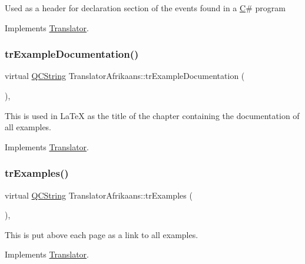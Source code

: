 Used as a header for declaration section of the events found in a \mbox{\hyperlink{class_c}{C}}\# program 

Implements \mbox{\hyperlink{class_translator}{Translator}}.

\mbox{\label{class_translator_afrikaans_a0e9bafa9d7cc3a476f5d3504bb607619}} 
\subsubsection{\texorpdfstring{trExampleDocumentation()}{trExampleDocumentation()}}
{\footnotesize\ttfamily virtual \mbox{\hyperlink{class_q_c_string}{Q\+C\+String}} Translator\+Afrikaans\+::tr\+Example\+Documentation (\begin{DoxyParamCaption}{ }\end{DoxyParamCaption})\hspace{0.3cm}{\ttfamily [inline]}, {\ttfamily [virtual]}}

This is used in La\+TeX as the title of the chapter containing the documentation of all examples. 

Implements \mbox{\hyperlink{class_translator}{Translator}}.

\mbox{\label{class_translator_afrikaans_a5948b1e757e3c83f6509f4b87d8a307a}} 
\subsubsection{\texorpdfstring{trExamples()}{trExamples()}}
{\footnotesize\ttfamily virtual \mbox{\hyperlink{class_q_c_string}{Q\+C\+String}} Translator\+Afrikaans\+::tr\+Examples (\begin{DoxyParamCaption}{ }\end{DoxyParamCaption})\hspace{0.3cm}{\ttfamily [inline]}, {\ttfamily [virtual]}}

This is put above each page as a link to all examples. 

Implements \mbox{\hyperlink{class_translator}{Translator}}.

\mbox{\label{class_translator_afrikaans_a0ec014d06b6517c521278dbf43ee9ead}} 
